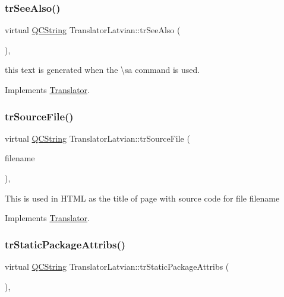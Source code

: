 \subsubsection{\texorpdfstring{trSeeAlso()}{trSeeAlso()}}
{\footnotesize\ttfamily virtual \mbox{\hyperlink{class_q_c_string}{Q\+C\+String}} Translator\+Latvian\+::tr\+See\+Also (\begin{DoxyParamCaption}{ }\end{DoxyParamCaption})\hspace{0.3cm}{\ttfamily [inline]}, {\ttfamily [virtual]}}

this text is generated when the \textbackslash{}sa command is used. 

Implements \mbox{\hyperlink{class_translator}{Translator}}.

\mbox{\label{class_translator_latvian_a4d467cfc281c7edc62a2f64ad176fc6f}} 
\subsubsection{\texorpdfstring{trSourceFile()}{trSourceFile()}}
{\footnotesize\ttfamily virtual \mbox{\hyperlink{class_q_c_string}{Q\+C\+String}} Translator\+Latvian\+::tr\+Source\+File (\begin{DoxyParamCaption}\item[{\mbox{\hyperlink{class_q_c_string}{Q\+C\+String}} \&}]{filename }\end{DoxyParamCaption})\hspace{0.3cm}{\ttfamily [inline]}, {\ttfamily [virtual]}}

This is used in H\+T\+ML as the title of page with source code for file filename 

Implements \mbox{\hyperlink{class_translator}{Translator}}.

\mbox{\label{class_translator_latvian_a473be083b0daf554663b2fabebd2f77b}} 
\subsubsection{\texorpdfstring{trStaticPackageAttribs()}{trStaticPackageAttribs()}}
{\footnotesize\ttfamily virtual \mbox{\hyperlink{class_q_c_string}{Q\+C\+String}} Translator\+Latvian\+::tr\+Static\+Package\+Attribs (\begin{DoxyParamCaption}{ }\end{DoxyParamCaption})\hspace{0.3cm}{\ttfamily [inline]}, {\ttfamily [virtual]}}

